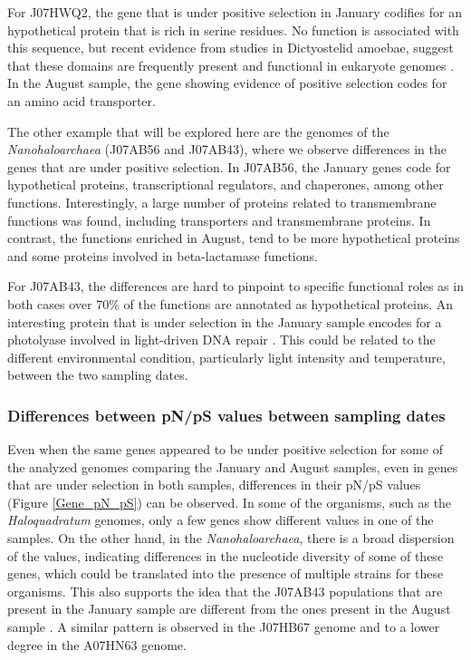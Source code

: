 For J07HWQ2, the gene that is under positive selection in January codifies for an hypothetical protein that is rich in serine residues. No function is associated with this sequence, but recent evidence from studies in Dictyostelid amoebae, suggest that these domains are frequently present and functional in eukaryote genomes \cite{Tian:2013jv}. In the August sample, the gene showing evidence of positive selection codes for an amino acid transporter.


The other example that will be explored here are the genomes of the \textit{Nanohaloarchaea} (J07AB56 and J07AB43), where we observe differences in the genes that are under positive selection. In J07AB56, the January genes code for hypothetical proteins, transcriptional regulators, and chaperones, among other functions. Interestingly, a large number of proteins related to transmembrane functions was found, including transporters and transmembrane proteins. In contrast, the functions enriched in August, tend to be more hypothetical proteins and some proteins involved in beta-lactamase functions. 

For J07AB43, the differences are hard to pinpoint to specific functional roles as in both cases over 70\% of the functions are annotated as hypothetical proteins. An interesting protein that is under selection in the January sample encodes for a photolyase involved in light-driven DNA repair \cite{Weber:2005fk}. This could be related to the different environmental condition, particularly light intensity and temperature, between the two sampling dates.

\subsubsection{Differences between pN/pS values between sampling dates}

Even when the same genes appeared to be under positive selection for some of the analyzed genomes comparing the January and August samples, even in genes that are under selection in both samples, differences in their pN/pS values (Figure \ref{Gene_pN_pS}) can be observed. In some of the organisms, such as the \textit{Haloquadratum} genomes, only a few genes show different values in one of the samples. On the other hand, in the \textit{Nanohaloarchaea}, there is a broad dispersion of the values, indicating differences in the nucleotide diversity of some of these genes, which could be translated into the presence of multiple strains for these organisms. This also supports the idea that the J07AB43 populations that are present in the January sample are different from the ones present in the August sample \cite{Vos:2011ux}. A similar pattern is observed in the J07HB67 genome and to a lower degree in the A07HN63 genome.


